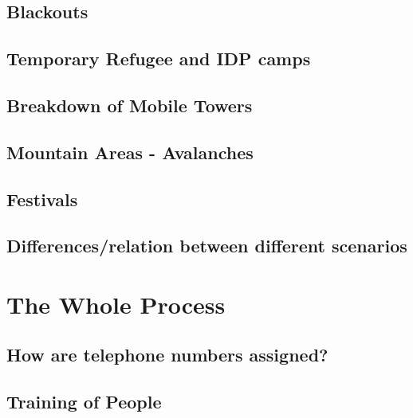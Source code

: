 \subsection{Blackouts}

\subsection{Temporary Refugee and IDP camps}

\subsection{Breakdown of Mobile Towers}

\subsection{Mountain Areas - Avalanches}

\subsection{Festivals}

\subsection{Differences/relation between different scenarios}




\section{The Whole Process}

\subsection{How are telephone numbers assigned?}

\subsection{Training of People}